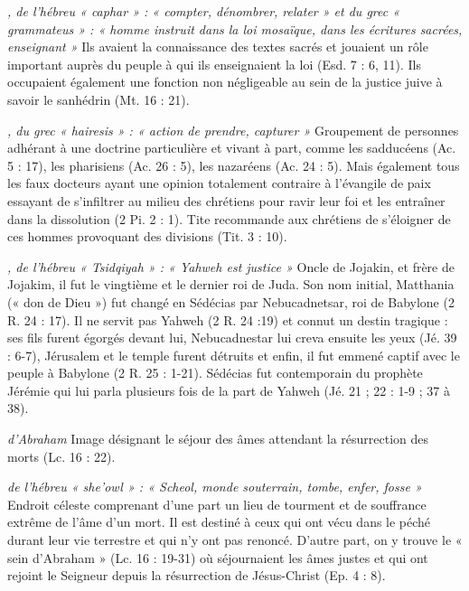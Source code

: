 \begin{multicols}{2}
\textit{, de l'hébreu « caphar » : « compter, dénombrer, relater » et du grec « grammateus » : « homme instruit dans la loi mosaïque, dans les écritures sacrées, enseignant »}\newline
Ils avaient la connaissance des textes sacrés et jouaient un rôle important auprès du peuple à qui ils enseignaient la loi (Esd. 7 : 6, 11). Ils occupaient également une fonction non négligeable au sein de la justice juive à savoir le sanhédrin (Mt. 16 : 21).

\textit{, du grec « hairesis » : « action de prendre, capturer »}\newline
Groupement de personnes adhérant à une doctrine particulière et vivant à part, comme les sadducéens (Ac. 5 : 17), les pharisiens (Ac. 26 : 5), les nazaréens (Ac. 24 : 5). Mais également tous les faux docteurs ayant une opinion totalement contraire à l'évangile de paix essayant de s'infiltrer au milieu des chrétiens pour ravir leur foi et les entraîner dans la dissolution (2 Pi. 2 : 1). Tite recommande aux chrétiens de s'éloigner de ces hommes provoquant des divisions (Tit. 3 : 10).

\textit{, de l'hébreu « Tsidqiyah » : « Yahweh est justice »}\newline
Oncle de Jojakin, et frère de Jojakim, il fut le vingtième et le dernier roi de Juda. Son nom initial, Matthania (« don de Dieu ») fut changé en Sédécias par Nebucadnetsar, roi de Babylone (2 R. 24 : 17). Il ne servit pas Yahweh (2 R. 24 :19) et connut un destin tragique : ses fils furent égorgés devant lui, Nebucadnestar lui creva ensuite les yeux (Jé. 39 : 6-7), Jérusalem et le temple furent détruits et enfin, il fut emmené captif avec le peuple à Babylone (2 R. 25 : 1-21). Sédécias fut contemporain du prophète Jérémie qui lui parla plusieurs fois de la part de Yahweh (Jé. 21 ; 22 : 1-9 ; 37 à 38).

\textit{d'Abraham}\newline
Image désignant le séjour des âmes attendant la résurrection des morts (Lc. 16 : 22).

\textit{de l'hébreu « she'owl » : « Scheol, monde souterrain, tombe, enfer, fosse »}\newline
Endroit céleste comprenant d'une part un lieu de tourment et de souffrance extrême de l'âme d'un mort. Il est destiné à ceux qui ont vécu dans le péché durant leur vie terrestre et qui n'y ont pas renoncé. D'autre part, on y trouve le « sein d'Abraham » (Lc. 16 : 19-31) où séjournaient les âmes justes et qui ont rejoint le Seigneur depuis la résurrection de Jésus-Christ (Ep. 4 : 8).


\end{multicols}
